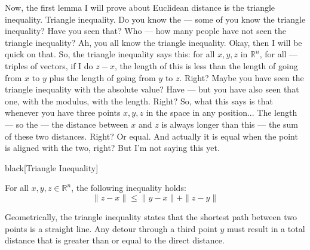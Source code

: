 \begin{spoken-clean}[00:24:42 - 00:26:37]
Now, the first lemma I will prove about Euclidean distance is the triangle inequality. Triangle inequality. Do you know the --- some of you know the triangle inequality? Have you seen that? Who --- how many people have not seen the triangle inequality? Ah, you all know the triangle inequality. Okay, then I will be quick on that. So, the triangle inequality says this: for all $x, y, z$ in $\mathbb{R}^n$, for all --- triples of vectors, if I do $z - x$, the length of this is less than the length of going from $x$ to $y$ plus the length of going from $y$ to $z$. Right?  Maybe you have seen the triangle inequality with the absolute value? Have --- but you have also seen that one, with the modulus, with the length. Right? So, what this says is that whenever you have three points $x, y, z$ in the space in any position...  The length --- so the --- the distance between $x$ and $z$ is always longer than this --- the sum of these two distances. Right? Or equal. And actually it is equal when the point is aligned with the two, right? But I'm not saying this yet.
\end{spoken-clean}

\begin{math-stroke}
\begin{color-box}{black}[Triangle Inequality]
\begin{lemma} \label{lem:triangle_inequality}
For all $x, y, z \in \mathbb{R}^n$, the following inequality holds:
\begin{equation} \label{eq:triangle_xyz}
\|z - x\| \le \|y - x\| + \|z - y\|
\end{equation}
\end{lemma}
\end{color-box}

\begin{center}
\end{center}

\begin{explanation-of-steps}
Geometrically, the triangle inequality states that the shortest path between two points is a straight line. Any detour through a third point $y$ must result in a total distance that is greater than or equal to the direct distance.
\end{explanation-of-steps}
\end{math-stroke}

